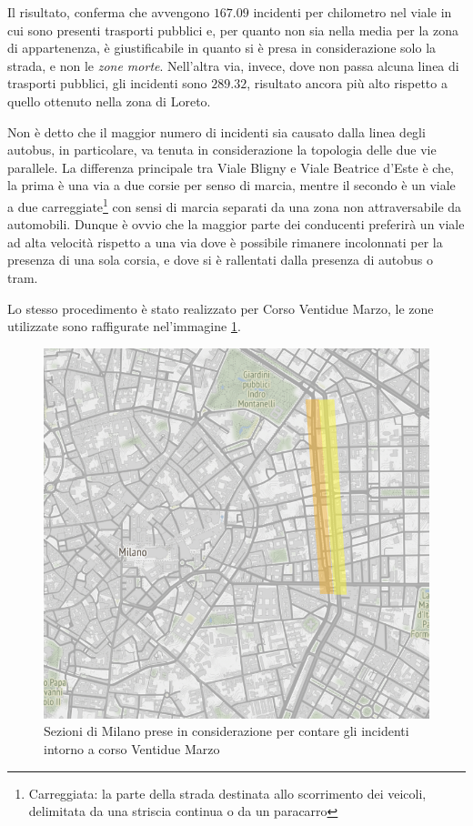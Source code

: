 \documentclass[a4paper,12pt]{report}
\newcommand{\quotestyle}[1]{\textit{#1}}
\begin{document}
Il risultato, conferma che avvengono $167.09$ incidenti per chilometro 
nel viale in cui sono presenti trasporti pubblici e, per quanto non sia nella media per la zona 
di appartenenza, è giustificabile in quanto si è presa in considerazione solo la strada, 
e non le \quotestyle{zone morte}.
Nell'altra via, invece, dove non passa alcuna linea di trasporti pubblici, 
gli incidenti sono $289.32$, risultato ancora più alto rispetto a quello ottenuto 
nella zona di Loreto. 

Non è detto che il maggior numero di incidenti sia causato dalla linea degli autobus, 
in particolare, va tenuta in considerazione la topologia delle due vie parallele.
La differenza principale tra Viale Bligny e Viale Beatrice d'Este è che, la prima è una via a due 
corsie per senso di marcia, mentre il secondo è un viale a due 
carreggiate\footnote{Carreggiata: la parte della strada destinata allo scorrimento dei veicoli, 
delimitata da una striscia continua o da un paracarro} 
con sensi di marcia separati da una zona non attraversabile da automobili. 
Dunque è ovvio che la maggior parte dei conducenti preferirà un viale ad alta velocità 
rispetto a una via dove è possibile rimanere incolonnati per la presenza di una sola 
corsia, e dove si è rallentati dalla presenza di autobus o tram.

Lo stesso procedimento è stato realizzato per Corso Ventidue Marzo, le zone utilizzate sono 
raffigurate nel'immagine \ref{fig:zona-22marzo-rect}. 

\begin{figure}
    \includegraphics[width=\linewidth]{../src/atm/zona_22marzo_rect.png}
    \caption{Sezioni di Milano prese in considerazione per contare gli incidenti intorno a corso Ventidue Marzo}
    \label{fig:zona-22marzo-rect}
\end{figure}
\end{document}
